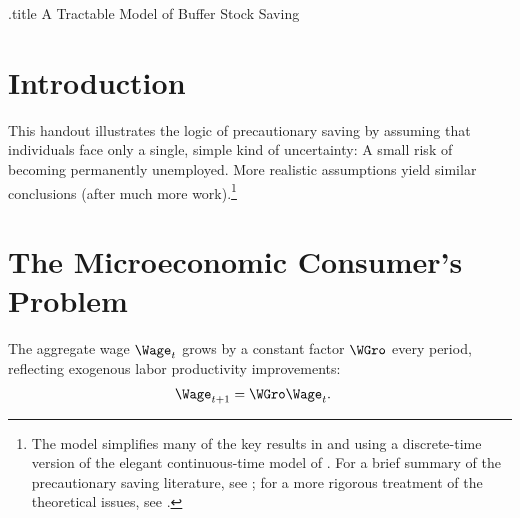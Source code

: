 \documentclass{\handout}
\begin{document}




\handoutHeader

\begin{verbatimwrite}{\jobname.title}
A Tractable Model of Buffer Stock Saving
\end{verbatimwrite}

\handoutNameMake

\section{Introduction} 
This handout illustrates the logic of precautionary saving by assuming that individuals face only a single, simple kind of uncertainty: A small risk of becoming permanently unemployed.  More realistic assumptions yield similar conclusions (after much more work).\footnote{The model simplifies many of the key results in \cite{carroll:brookings} and \cite{BufferStockTheory} using a discrete-time version of the elegant continuous-time model of \cite{toche:urisk}.  For a brief summary of the precautionary saving literature, see \cite{CarrollKimballPSPW}; for a more rigorous treatment of the theoretical issues, see \cite{BufferStockTheory}.}


\section{The Microeconomic Consumer's Problem}
The aggregate wage $\Wage_{t}$ grows by a constant factor $\WGro$ every period, reflecting exogenous labor productivity improvements:
\begin{equation}\begin{gathered}\begin{aligned}
        \Wage_{t+1} & =  \WGro \Wage_{t}.
\end{aligned}\end{gathered}\end{equation}
\end{document}
